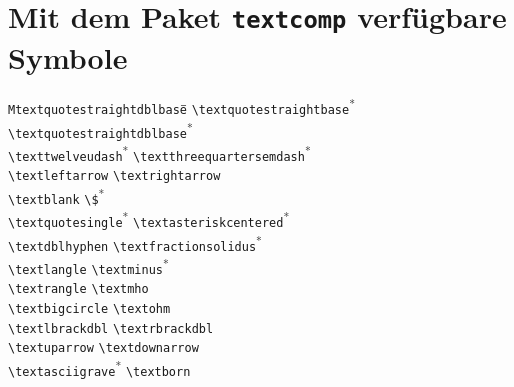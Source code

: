 

\appendix

\enlargethispage*{2.5\baselineskip}

\section{Mit dem Paket \texttt{textcomp} verfügbare Symbole}
\label{textsymbols}
{\small
\begin{tabbing}
\quad\quad\=\texttt{Mtextquotestraightdblbase}\hspace{1cm}\=\quad\quad\=\kill
\textquotestraightbase \> \lstinline+\textquotestraightbase+\textsuperscript{*}  \> \textquotestraightdblbase \> \lstinline+\textquotestraightdblbase+\textsuperscript{*} \\
\texttwelveudash \> \lstinline+\texttwelveudash+\textsuperscript{*}  \> \textthreequartersemdash \> \lstinline+\textthreequartersemdash+\textsuperscript{*} \\
\textleftarrow \> \lstinline+\textleftarrow+ \> \textrightarrow \> \lstinline+\textrightarrow+\\
\textblank \> \lstinline+\textblank+ \> \textdollar \> \lstinline+\$+\textsuperscript{*} \\
\textquotesingle \> \lstinline+\textquotesingle+\textsuperscript{*}  \> \textasteriskcentered \> \lstinline+\textasteriskcentered+\textsuperscript{*} \\
\textdblhyphen \> \lstinline+\textdblhyphen+ \> \textfractionsolidus \> \lstinline+\textfractionsolidus+\textsuperscript{*} \\
\textlangle \> \lstinline+\textlangle+ \> \textminus \> \lstinline+\textminus+\textsuperscript{*} \\
\textrangle \> \lstinline+\textrangle+ \> \textmho \> \lstinline+\textmho+\\
\textbigcircle \> \lstinline+\textbigcircle+ \> \textohm \> \lstinline+\textohm+\\
\textlbrackdbl \> \lstinline+\textlbrackdbl+ \> \textrbrackdbl \> \lstinline+\textrbrackdbl+\\
\textuparrow \> \lstinline+\textuparrow+ \> \textdownarrow \> \lstinline+\textdownarrow+\\
\textasciigrave \> \lstinline+\textasciigrave+\textsuperscript{*}  \> \textborn \> \lstinline+\textborn+\\

\end{tabbing}}
